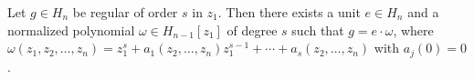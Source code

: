 Let $g \in H_n$ be regular of order $s$ in $z_1$. Then there exists a unit $e \in H_n$ and a normalized polynomial $\omega \in H_{n-1}[z_1]$ of degree $s$ such that $g = e \cdot \omega$, where $\omega(z_1, z_2, \ldots, z_n) = z_1^s + a_1(z_2, \ldots, z_n)z_1^{s-1} + \cdots + a_s(z_2, \ldots, z_n)$ with $a_j(0) = 0$.

